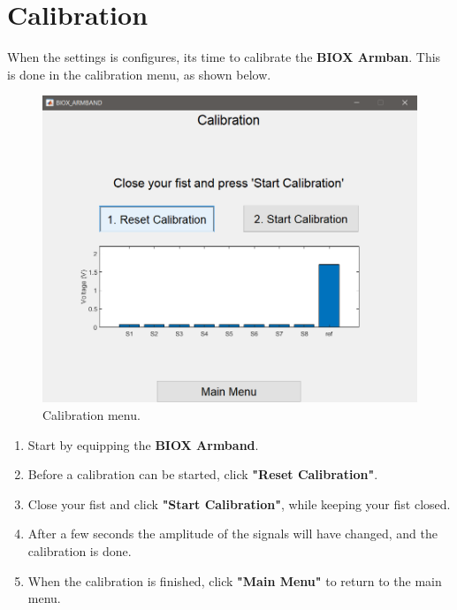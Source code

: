 \chapter{Calibration}
When the settings is configures, its time to calibrate the \textbf{BIOX Armban}. This is done in the calibration menu, as shown below.\\

\begin{figure}[H]
    \centering
    \includegraphics[width=0.6\linewidth]{figures/AppPics/3_Calibration_NEW.png}
    \caption{Calibration menu.}
    \label{fig:my_label}
\end{figure}

\begin{enumerate}[label=\textbf{Step \arabic*}:]
    \item Start by equipping the \textbf{BIOX Armband}.
    \item Before a calibration can be started, click \textbf{"Reset Calibration"}.
    \item Close your fist and click \textbf{"Start Calibration"}, while keeping your fist closed.
    \item After a few seconds the amplitude of the signals will have changed, and the calibration is done.
    \item When the calibration is finished, click \textbf{"Main Menu"} to return to the main menu. 
\end{enumerate}